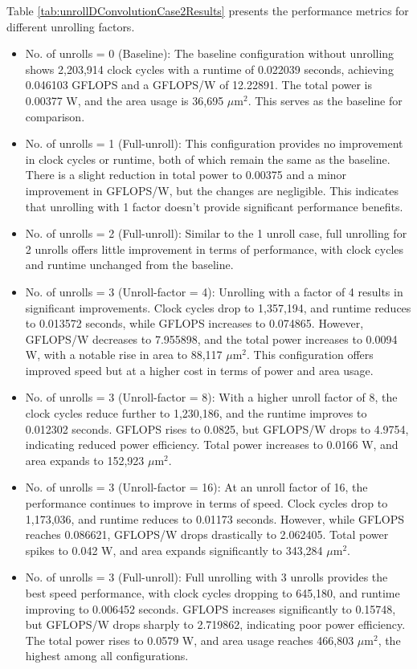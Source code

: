 Table \ref{tab:unrollDConvolutionCase2Results} presents the performance metrics for different unrolling factors.
\begin{itemize}
    \item No. of unrolls = 0 (Baseline): The baseline configuration without unrolling shows 2,203,914 clock cycles with a runtime of 0.022039 seconds, achieving 0.046103 GFLOPS and a GFLOPS/W of 12.22891. The total power is 0.00377 W, and the area usage is 36,695 $\mu\text{m}^2$. This serves as the baseline for comparison.
    \item No. of unrolls = 1 (Full-unroll): This configuration provides no improvement in clock cycles or runtime, both of which remain the same as the baseline. There is a slight reduction in total power to 0.00375 and a minor improvement in GFLOPS/W, but the changes are negligible. This indicates that unrolling with 1 factor doesn't provide significant performance benefits.
    \item No. of unrolls = 2 (Full-unroll): Similar to the 1 unroll case, full unrolling for 2 unrolls offers little improvement in terms of performance, with clock cycles and runtime unchanged from the baseline.
    \item No. of unrolls = 3 (Unroll-factor = 4): Unrolling with a factor of 4 results in significant improvements. Clock cycles drop to 1,357,194, and runtime reduces to 0.013572 seconds, while GFLOPS increases to 0.074865. However, GFLOPS/W decreases to 7.955898, and the total power increases to 0.0094 W, with a notable rise in area to 88,117 $\mu\text{m}^2$. This configuration offers improved speed but at a higher cost in terms of power and area usage.
    \item No. of unrolls = 3 (Unroll-factor = 8): With a higher unroll factor of 8, the clock cycles reduce further to 1,230,186, and the runtime improves to 0.012302 seconds. GFLOPS rises to 0.0825, but GFLOPS/W drops to 4.9754, indicating reduced power efficiency. Total power increases to 0.0166 W, and area expands to 152,923 $\mu\text{m}^2$.
    \item No. of unrolls = 3 (Unroll-factor = 16): At an unroll factor of 16, the performance continues to improve in terms of speed. Clock cycles drop to 1,173,036, and runtime reduces to 0.01173 seconds. However, while GFLOPS reaches 0.086621, GFLOPS/W drops drastically to 2.062405. Total power spikes to 0.042 W, and area expands significantly to 343,284 $\mu\text{m}^2$.
    \item No. of unrolls = 3 (Full-unroll): Full unrolling with 3 unrolls provides the best speed performance, with clock cycles dropping to 645,180, and runtime improving to 0.006452 seconds. GFLOPS increases significantly to 0.15748, but GFLOPS/W drops sharply to 2.719862, indicating poor power efficiency. The total power rises to 0.0579 W, and area usage reaches 466,803 $\mu\text{m}^2$, the highest among all configurations.
    
\end{itemize}

